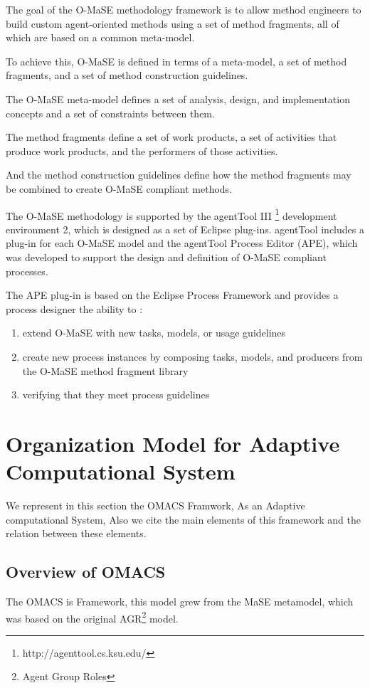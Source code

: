 The goal of the O-MaSE methodology framework is to allow method engineers to
build custom agent-oriented methods using a set of method fragments, all of which are
based on a common meta-model\cite{omacs7}.

To achieve this, O-MaSE is defined in terms of a meta-model, a set of method fragments, 
and a set of method construction guidelines. 

The O-MaSE meta-model defines a set of analysis, design, and implementation concepts and a
set of constraints between them. 

The method fragments define a set of work products, a set of activities that produce work products, and the performers of those activities.

And the method construction guidelines define how the method fragments may be
combined to create O-MaSE compliant methods.

The O-MaSE methodology is supported by the agentTool III \footnote{http://agenttool.cs.ksu.edu/}
 development environment 2, 
which is designed as a set of Eclipse plug-ins. agentTool includes a plug-in for each O-MaSE model 
and the agentTool Process Editor (APE), which was developed to support the design and definition 
of O-MaSE compliant processes\cite{omacs7}.

The APE plug-in is based on the Eclipse Process Framework and provides a process designer the ability to : 
\begin{enumerate}
\item 
	extend O-MaSE with new tasks, models, or usage guidelines
\item
	create new process instances by composing tasks, models, and producers from the O-MaSE method fragment library 
\item
	 verifying that they meet process guidelines
\end{enumerate} 
 
\section{Organization Model for Adaptive Computational System}
We represent in this section the OMACS Framwork, As an Adaptive computational System, Also we cite the main elements of this framework and the relation between these elements.
\subsection{Overview of OMACS}
The OMACS is Framework, this model grew from the MaSE metamodel, 
which was based on the original AGR\footnote{Agent Group Roles} model\cite{omacs4}.
 
